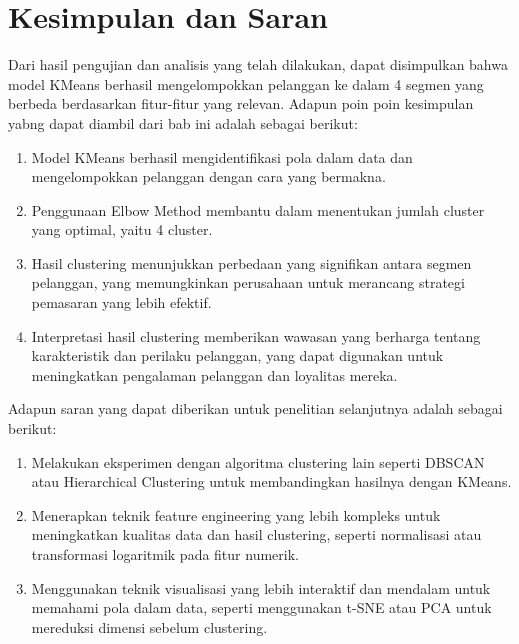 \newpage
\section{Kesimpulan dan Saran}

Dari hasil pengujian dan analisis yang telah dilakukan, dapat disimpulkan bahwa model KMeans berhasil mengelompokkan pelanggan ke dalam 4 segmen yang berbeda berdasarkan fitur-fitur yang relevan. Adapun poin poin kesimpulan yabng dapat diambil dari bab ini adalah sebagai berikut:

\begin{enumerate}
    \item Model KMeans berhasil mengidentifikasi pola dalam data dan mengelompokkan pelanggan dengan cara yang bermakna.
    \item Penggunaan Elbow Method membantu dalam menentukan jumlah cluster yang optimal, yaitu 4 cluster.
    \item Hasil clustering menunjukkan perbedaan yang signifikan antara segmen pelanggan, yang memungkinkan perusahaan untuk merancang strategi pemasaran yang lebih efektif.
    \item Interpretasi hasil clustering memberikan wawasan yang berharga tentang karakteristik dan perilaku pelanggan, yang dapat digunakan untuk meningkatkan pengalaman pelanggan dan loyalitas mereka.
\end{enumerate}

Adapun saran yang dapat diberikan untuk penelitian selanjutnya adalah sebagai berikut:

\begin{enumerate}
    \item Melakukan eksperimen dengan algoritma clustering lain seperti DBSCAN atau Hierarchical Clustering untuk membandingkan hasilnya dengan KMeans.
    \item Menerapkan teknik feature engineering yang lebih kompleks untuk meningkatkan kualitas data dan hasil clustering, seperti normalisasi atau transformasi logaritmik pada fitur numerik.
    \item Menggunakan teknik visualisasi yang lebih interaktif dan mendalam untuk memahami pola dalam data, seperti menggunakan t-SNE atau PCA untuk mereduksi dimensi sebelum clustering.
\end{enumerate}